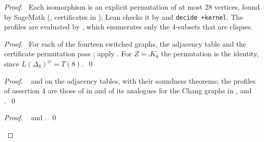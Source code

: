 \begin{proof}
 \pfsketch\ Each isomorphism is an explicit permutation of at most 28 vertices, found by
 SageMath (, certificates in
 ); Lean checks it by  and
 \texttt{decide +kernel}. The profiles are evaluated by , which
 enumerates only the 4-subsets that are cliques.
 \begin{proof}\raggedright\pf\ For each of the fourteen switched graphs, the adjacency table and
  the certificate permutation pass ; apply
  . For $Z=\comp{K_8}$ the permutation is the
  identity, since $L(\Delta_8)^{\varnothing}=T(8)$.~\qed\end{proof}
 \begin{proof}\raggedright\pf\  and  on the
  adjacency tables, with their soundness theorems; the profiles of assertion 4 are those of
   in
   and of its analogues for the Chang graphs in
  ,
   and
  .~\qed\end{proof}
 \qedstep
 \begin{proof}\pf\  and .~\qed\end{proof}
\end{proof}

